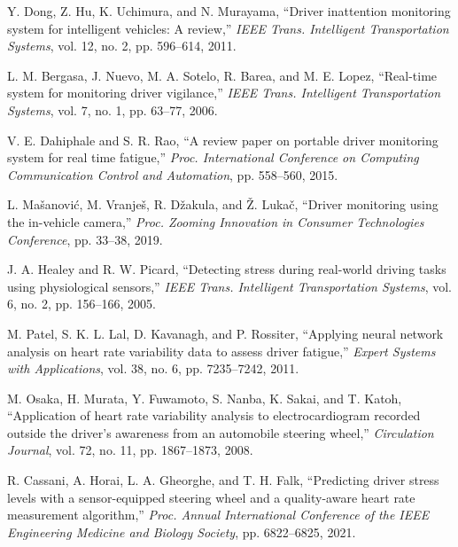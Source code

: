 \documentclass[honka]{nitkagawathesis}%
\begin{document}
\begin{thebibliography}{99}
  Y. Dong, Z. Hu, K. Uchimura, and N. Murayama, ``Driver inattention monitoring system for intelligent vehicles: A review,'' {\em IEEE Trans. Intelligent Transportation 
  Systems}, vol.           
  12, no. 2, pp. 596--614, 2011.

  L. M. Bergasa, J. Nuevo, M. A. Sotelo, R. Barea, and M. E. Lopez, ``Real-time system for monitoring driver vigilance,'' {\em IEEE Trans. Intelligent Transportation 
  Systems}, vol. 7, no. 
  1, pp. 63--77, 2006.

  V. E. Dahiphale and S. R. Rao, ``A review paper on portable driver monitoring system for real time fatigue,'' {\em Proc. International Conference on Computing 
  Communication 
  Control and Automation}, pp. 558--560, 2015.

  L. Ma\v{s}anovi\'{c}, M. Vranje\v{s}, R. D\v{z}akula, and \v{Z}. Luka\v{c}, ``Driver monitoring using the in-vehicle camera,'' {\em Proc. Zooming Innovation in 
  Consumer Technologies Conference}, pp. 
  33--38, 2019.

  J. A. Healey and R. W. Picard, ``Detecting stress during real-world driving tasks using physiological sensors,'' {\em IEEE Trans. Intelligent Transportation Systems}, 
  vol. 6, no. 2, pp. 156--166, 2005.

  M. Patel, S. K. L. Lal, D. Kavanagh, and P. Rossiter, ``Applying neural network analysis on heart rate variability data to assess driver fatigue,'' {\em Expert Systems 
  with Applications}, vol. 38, no. 6, pp. 7235--7242, 2011.

  M. Osaka, H. Murata, Y. Fuwamoto, S. Nanba, K. Sakai, and T. Katoh, ``Application of heart rate variability analysis to electrocardiogram recorded outside the driver's 
  awareness from an automobile steering wheel,'' {\em Circulation Journal}, vol. 72, no. 11, pp. 1867--1873, 2008.

  R. Cassani, A. Horai, L. A. Gheorghe, and T. H. Falk, ``Predicting driver stress levels with a sensor-equipped steering wheel and a quality-aware heart rate 
  measurement algorithm,'' {\em Proc. Annual International Conference of the IEEE Engineering Medicine and Biology Society}, pp. 6822--6825, 2021.


\end{thebibliography}
\end{document}

